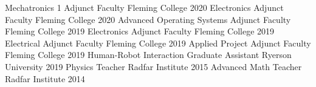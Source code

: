 

\begin{cvhonors}

  \cvhonor
    {Mechatronics 1} %
    {Adjunct Faculty} %
    {Fleming College} %
    {2020} %
  \cvhonor
    {Electronics} %
    {Adjunct Faculty} %
    {Fleming College} %
    {2020} %
  \cvhonor
    {Advanced Operating Systems} %
    {Adjunct Faculty} %
    {Fleming College} %
    {2019} %
  \cvhonor
    {Electronics} %
    {Adjunct Faculty} %
    {Fleming College} %
    {2019} %
  \cvhonor
    {Electrical} %
    {Adjunct Faculty} %
    {Fleming College} %
    {2019} %
  \cvhonor
    {Applied Project} %
    {Adjunct Faculty} %
    {Fleming College} %
    {2019} %
  \cvhonor
    {Human-Robot Interaction} %
    {Graduate Assistant} %
    {Ryerson University} %
    {2019} %
  \cvhonor
    {Physics} %
    {Teacher} %
    {Radfar Institute} %
    {2015} %
  \cvhonor
    {Advanced Math} %
    {Teacher} %
    {Radfar Institute} %
    {2014} %
\end{cvhonors}
